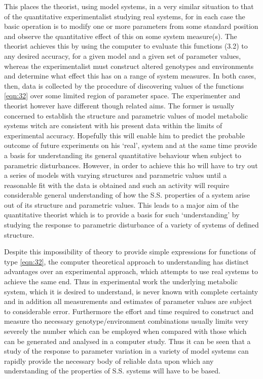 This places the theorist, using model systems, in a very similar situation to that of the quantitative experimentalist studying real systems, for in each case the basic operation is to modify one or more parameters from some standard position and observe the quantitative effect of this on some system measure(s). The theorist achieves this by using the computer to evaluate this functions (3.2) to any desired accuracy, for a given model and a given set of parameter values, whereas the experimentalist must construct altered genotypes and environments and determine what effect this has on a range of system measures. In both cases, then, data is collected by the procedure of discovering values of the functions \eqref{eqn:32} over some limited region of parameter space. The experimenter and theorist however have different though related aims. The former is usually concerned to establish the structure and parametric values of model metabolic systems witch are consistent with his present data within the limits of experimental accuracy. Hopefully this will enable him to predict the probable outcome of future experiments on his `real', system and at the same time provide a basis for understanding its general quantitative behaviour when subject to parametric disturbances. However, in order to achieve this ho will have to try out a series of models with varying structures and parametric values until a reasonable fit with the data is obtained and such an activity will require considerable general understanding of how the S.S. properties of a system arise out of its structure and parametric values. This leads to a major aim of the quantitative theorist which is to provide a basis for such `understanding' by studying the response to parametric disturbance of a variety of systems of defined structure.

Despite this impossibility of theory to provide simple expressions for functions of type \eqref{eqn:32}, the computer theoretical approach to understanding has distinct advantages over an experimental approach, which attempts to use real systems to achieve the same end. Thus in experimental work the underlying metabolic system, which it is desired to understand, is never known with complete certainty and in addition all measurements and estimates of parameter values are subject to considerable error. Furthermore the effort and time required to construct and measure tho necessary genotype/environment combinations usually limits very severely the number which can be employed when compared with those which can be generated and analysed in a computer study. Thus it can be seen that a study of the response to parameter variation in a variety of model systems can rapidly provide the necessary body of reliable data upon which any understanding of the properties of S.S. systems will have to be based.

